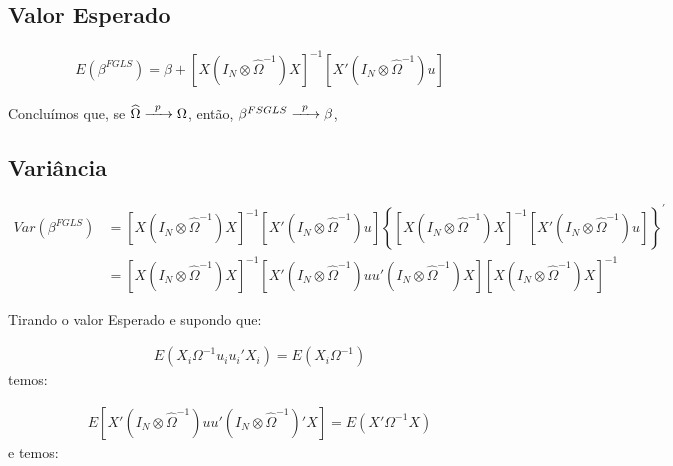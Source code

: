 \documentclass[11pt,oneside,a4paper]{article}
\numberwithin{equation}{section}
\begin{document}
\subsection*{Valor Esperado}

\vspace{-1 em}
\begin{align*}
E(\beta^{FGLS})
= 
\beta +
\left[ X \left( I_{N} \otimes \widehat{\Omega}^{-1} \right) X \right]^{-1}
\left[ X' \left( I_{N} \otimes \widehat{\Omega}^{-1} \right) u \right]
\end{align*}

Concluímos que, se 
$\widehat{\Omega} \xrightarrow{\enskip p \enskip} \Omega$,
então,
$\beta^{FSGLS} \xrightarrow{\enskip p \enskip} \beta$,

\subsection*{Variância}

\vspace{-1 em}
\begin{align*}
Var(\beta^{FGLS})
&= 
\left[ X \left( I_{N} \otimes \widehat{\Omega}^{-1} \right) X \right]^{-1}
\left[ X' \left( I_{N} \otimes \widehat{\Omega}^{-1} \right) u \right]
\left\{ 
\left[ X \left( I_{N} \otimes \widehat{\Omega}^{-1} \right) X \right]^{-1}
\left[ X' \left( I_{N} \otimes \widehat{\Omega}^{-1} \right) u \right]
\right\}^{\prime}
\\
&=
\left[ X \left( I_{N} \otimes \widehat{\Omega}^{-1} \right) X \right]^{-1}
\left[
X' \left( I_{N} \otimes \widehat{\Omega}^{-1} \right) 
u u'
\left( I_{N} \otimes \widehat{\Omega}^{-1} \right) X
\right]
\left[ X \left( I_{N} \otimes \widehat{\Omega}^{-1} \right) X \right]^{-1}
\end{align*}

Tirando o valor Esperado e supondo que:

\vspace{-1.5 em}
\begin{align*}
E(X_{i} \Omega^{-1} u_{i} u_{i}' X_{i}) = E(X_{i} \Omega^{-1})
\end{align*}
temos:

\vspace{-1.5 em}
\begin{align*}
E\left[ X' \left( I_{N} \otimes \widehat{\Omega}^{-1} \right)
	u u'
\left( I_{N} \otimes \widehat{\Omega}^{-1} \right)' X \right]
=
E(X' \Omega^{-1} X)
\end{align*}
e temos:
\end{document}
